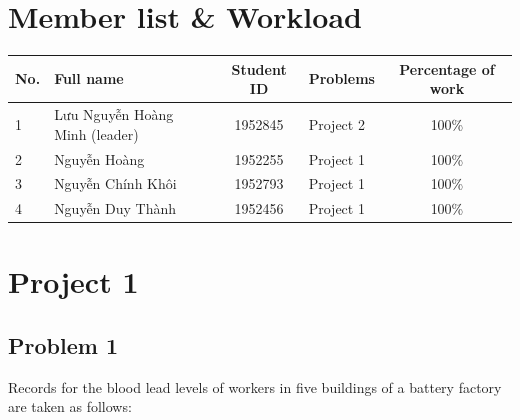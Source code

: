\documentclass[a4paper]{article}
\numberwithin{equation}{section}
\begin{document}

\newpage
\tableofcontents
\newpage


\section*{Member list \& Workload}
\begin{center}
  \begin{tabular}{llclc}
    \toprule
    \textbf{No.} & \textbf{Full name}             & \textbf{Student ID} & \textbf{Problems} & \textbf{Percentage of work} \\
    \midrule
    1            & Lưu Nguyễn Hoàng Minh (leader) & 1952845             & Project 2         & 100\%                       \\
    2            & Nguyễn Hoàng                   & 1952255             & Project 1         & 100\%                       \\
    3            & Nguyễn Chính Khôi              & 1952793             & Project 1         & 100\%                       \\
    4            & Nguyễn Duy Thành               & 1952456             & Project 1         & 100\%                       \\
    \bottomrule
  \end{tabular}
\end{center}


\newpage
\section{Project 1}
\subsection{Problem 1}

Records for the blood lead levels of workers in five buildings of a battery factory are taken as follows:
\end{document}

